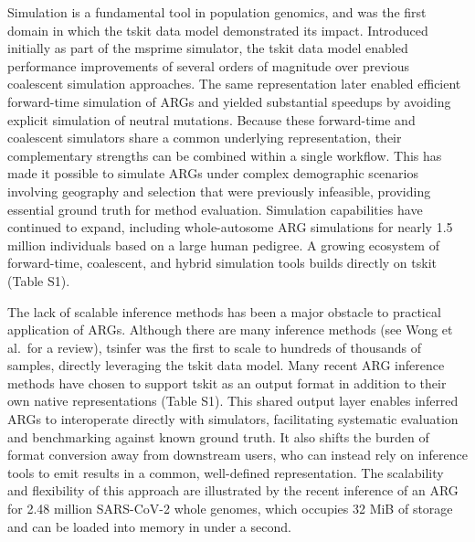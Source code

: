 \documentclass{article}
\begin{document}
Simulation is a fundamental tool in population genomics, and
was the first domain in which the tskit data model demonstrated its impact.
Introduced initially as part of the msprime simulator,
the tskit data model enabled performance improvements of
several orders of magnitude
over previous coalescent simulation approaches\cite{kelleher2016efficient}.
The same representation later
enabled efficient forward-time simulation of ARGs
and yielded substantial speedups by avoiding
explicit simulation of neutral mutations\cite{kelleher2018efficient}.
Because these forward-time and coalescent
simulators share a common underlying representation, their complementary
strengths can be combined within a single workflow. This has made it possible
to simulate ARGs under complex demographic scenarios involving geography and
selection that were previously infeasible, providing essential ground truth for
method evaluation. Simulation capabilities have continued to expand,
including whole-autosome ARG simulations for nearly 1.5 million individuals
based on a large human pedigree\cite{andersontrocme2023genes}.
A growing ecosystem of forward-time, coalescent, and hybrid simulation tools
builds directly on tskit (Table S1).


The lack of scalable inference methods has been a major obstacle
to practical application of ARGs. Although there
are many inference methods (see Wong et al.\cite{wong2024general}\ for a review),
tsinfer was the first to scale to hundreds of thousands of samples,
directly leveraging the tskit data model\cite{kelleher2019inferring}.
Many recent ARG inference methods have chosen to support tskit
as an output format in addition to their
own native representations (Table S1).
This shared output layer enables inferred ARGs to
interoperate directly with simulators, facilitating systematic evaluation and
benchmarking against known ground truth. It also shifts the burden of format
conversion away from downstream users, who can instead rely on inference tools
to emit results in a common, well-defined representation. The scalability and
flexibility of this approach are illustrated by the recent inference of an ARG
for 2.48 million SARS-CoV-2 whole genomes, which occupies 32 MiB of storage and
can be loaded into memory in under a second\cite{zhan2025pandemic}.

\end{document}
